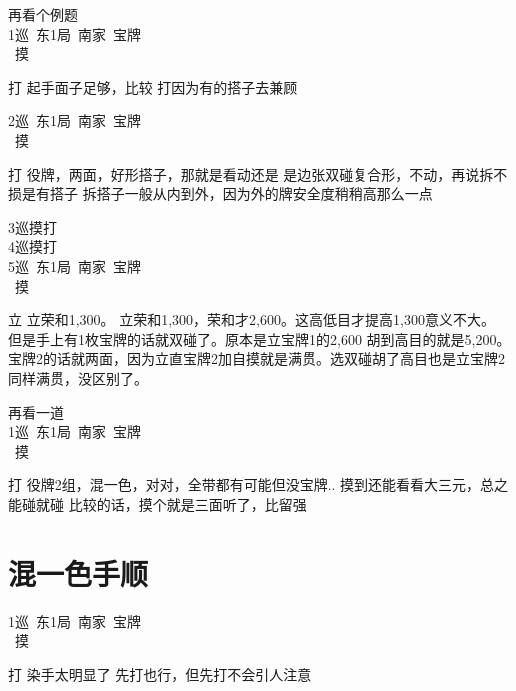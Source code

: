 \documentclass[小V的日麻笔记.tex]{subfiles}
\begin{document}
再看个例题 \\
1巡\ 东1局\ 南家\ 宝牌\\
\ 摸 \\
\begin{itemize}
\arrowitem 打
\arrowitem 起手面子足够，比较
\arrowitem 打因为有的搭子去兼顾
\end{itemize}
2巡\ 东1局\ 南家\ 宝牌\\
\ 摸 \\
\begin{itemize}
\arrowitem 打
\arrowitem 役牌，两面，好形搭子，那就是看动还是
\arrowitem {}是边张双碰复合形，不动，再说拆不损是有搭子
\arrowitem 拆搭子一般从内到外，因为外的牌安全度稍稍高那么一点
\end{itemize}
3巡摸打 \\
4巡摸打 \\
5巡\ 东1局\ 南家\ 宝牌\\
\ 摸 \\
\begin{itemize}
\arrowitem 立
\arrowitem 立荣和1,300。 立荣和1,300，荣和才2,600。这高低目才提高1,300意义不大。
\arrowitem 但是手上有1枚宝牌的话就双碰了。原本是立宝牌1的2,600 胡到高目的就是5,200。
\arrowitem 宝牌2的话就两面，因为立直宝牌2加自摸就是满贯。选双碰胡了高目也是立宝牌2同样满贯，没区别了。
\end{itemize}
再看一道 \\
1巡\ 东1局\ 南家\ 宝牌\\
\ 摸 \\
\begin{itemize}
\arrowitem 打
\arrowitem 役牌2组，混一色，对对，全带都有可能但没宝牌..
\arrowitem 摸到还能看看大三元，总之能碰就碰
\arrowitem 比较的话，摸个就是三面听了，比留强
\end{itemize}

\section{混一色手顺}
1巡\ 东1局\ 南家\ 宝牌\\
\ 摸 \\
\begin{itemize}
\arrowitem 打
\arrowitem 染手太明显了
\arrowitem 先打也行，但先打不会引人注意
\end{itemize}
\end{document}
